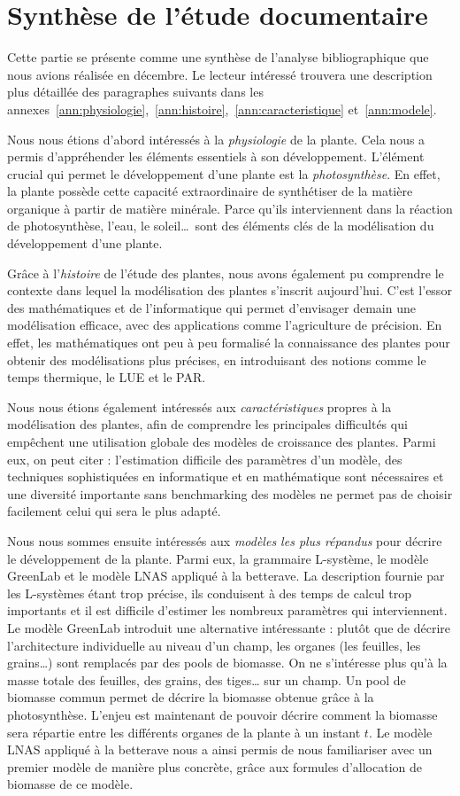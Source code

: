 \section{Synthèse de l'étude documentaire}
Cette partie se présente comme une synthèse de l’analyse bibliographique que nous avions réalisée en décembre.
Le lecteur intéressé trouvera une description plus détaillée des paragraphes suivants
dans les annexes~\ref{ann:physiologie},~\ref{ann:histoire},~\ref{ann:caracteristique}
et~\ref{ann:modele}.

Nous nous étions d’abord intéressés à la \emph{physiologie} de la plante. Cela nous a permis d’appréhender les éléments essentiels à son développement.
L’élément crucial qui permet le développement d’une plante est la \emph{photosynthèse}. En effet, la plante possède cette capacité extraordinaire de synthétiser de la matière organique à partir de matière minérale. 
Parce qu’ils interviennent dans la réaction de photosynthèse, l’eau, le soleil\dots ~sont des éléments clés de la modélisation du développement d’une plante.

Grâce à l’\emph{histoire} de l’étude des plantes, nous avons également pu comprendre le contexte dans lequel la modélisation des plantes s’inscrit aujourd’hui. C’est l’essor des mathématiques et de l’informatique qui permet d’envisager demain une modélisation efficace, avec des applications comme l’agriculture de précision. 
En effet, les mathématiques ont peu à peu formalisé la connaissance des plantes pour obtenir des modélisations plus précises, en introduisant des notions comme le temps thermique, le LUE et le PAR.

Nous nous étions également intéressés aux \emph{caractéristiques} propres à la modélisation des plantes, afin de comprendre les principales difficultés qui empêchent une utilisation globale des modèles de croissance des plantes. Parmi eux, on peut citer : l’estimation difficile des paramètres d’un modèle, des techniques sophistiquées en informatique et en mathématique sont nécessaires et une diversité importante sans benchmarking des modèles ne permet pas de choisir facilement celui qui sera le plus adapté. 

Nous nous sommes ensuite intéressés aux \emph{modèles les plus répandus} pour décrire le développement de la plante. Parmi eux, la grammaire L-système, le modèle GreenLab et le modèle LNAS appliqué à la betterave. La description fournie par les L-systèmes étant trop précise, ils conduisent à des temps de calcul trop importants et il est difficile d’estimer les nombreux paramètres qui interviennent.
Le modèle GreenLab introduit une alternative intéressante : plutôt que de décrire l’architecture individuelle au niveau d’un champ, les organes (les feuilles, les grains…) sont remplacés par des pools de biomasse. On ne s’intéresse plus qu’à la masse totale des feuilles, des grains, des tiges… sur un champ. Un pool de biomasse commun permet de décrire la biomasse obtenue grâce à la photosynthèse. L’enjeu est maintenant de pouvoir décrire comment la biomasse sera répartie entre les différents organes de la plante à un instant $t$. Le modèle LNAS appliqué à la betterave nous a ainsi permis de nous familiariser avec un premier modèle de manière plus concrète, grâce aux formules d’allocation de biomasse de ce modèle.
